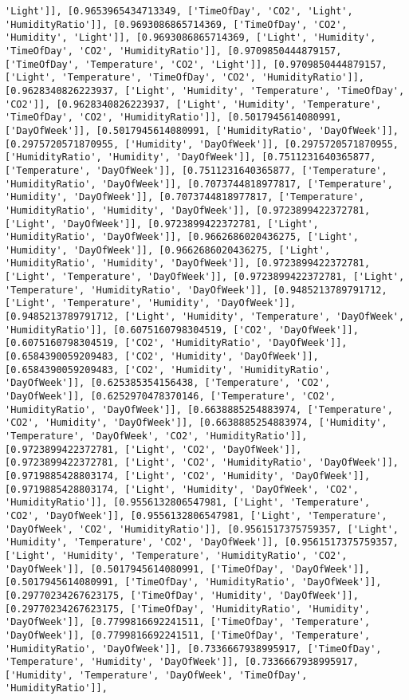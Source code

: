 \documentclass[11pt]{article}
\begin{document}
\begin{Verbatim}[commandchars=\\\{\}]
'Light']], [0.9653965434713349, ['TimeOfDay', 'CO2', 'Light', 'HumidityRatio']], [0.9693086865714369, ['TimeOfDay', 'CO2', 'Humidity', 'Light']], [0.9693086865714369, ['Light', 'Humidity', 'TimeOfDay', 'CO2', 'HumidityRatio']], [0.9709850444879157, ['TimeOfDay', 'Temperature', 'CO2', 'Light']], [0.9709850444879157, ['Light', 'Temperature', 'TimeOfDay', 'CO2', 'HumidityRatio']], [0.9628340826223937, ['Light', 'Humidity', 'Temperature', 'TimeOfDay', 'CO2']], [0.9628340826223937, ['Light', 'Humidity', 'Temperature', 'TimeOfDay', 'CO2', 'HumidityRatio']], [0.5017945614080991, ['DayOfWeek']], [0.5017945614080991, ['HumidityRatio', 'DayOfWeek']], [0.2975720571870955, ['Humidity', 'DayOfWeek']], [0.2975720571870955, ['HumidityRatio', 'Humidity', 'DayOfWeek']], [0.7511231640365877, ['Temperature', 'DayOfWeek']], [0.7511231640365877, ['Temperature', 'HumidityRatio', 'DayOfWeek']], [0.7073744818977817, ['Temperature', 'Humidity', 'DayOfWeek']], [0.7073744818977817, ['Temperature', 'HumidityRatio', 'Humidity', 'DayOfWeek']], [0.9723899422372781, ['Light', 'DayOfWeek']], [0.9723899422372781, ['Light', 'HumidityRatio', 'DayOfWeek']], [0.9662686020436275, ['Light', 'Humidity', 'DayOfWeek']], [0.9662686020436275, ['Light', 'HumidityRatio', 'Humidity', 'DayOfWeek']], [0.9723899422372781, ['Light', 'Temperature', 'DayOfWeek']], [0.9723899422372781, ['Light', 'Temperature', 'HumidityRatio', 'DayOfWeek']], [0.9485213789791712, ['Light', 'Temperature', 'Humidity', 'DayOfWeek']], [0.9485213789791712, ['Light', 'Humidity', 'Temperature', 'DayOfWeek', 'HumidityRatio']], [0.6075160798304519, ['CO2', 'DayOfWeek']], [0.6075160798304519, ['CO2', 'HumidityRatio', 'DayOfWeek']], [0.6584390059209483, ['CO2', 'Humidity', 'DayOfWeek']], [0.6584390059209483, ['CO2', 'Humidity', 'HumidityRatio', 'DayOfWeek']], [0.625385354156438, ['Temperature', 'CO2', 'DayOfWeek']], [0.6252970478370146, ['Temperature', 'CO2', 'HumidityRatio', 'DayOfWeek']], [0.6638885254883974, ['Temperature', 'CO2', 'Humidity', 'DayOfWeek']], [0.6638885254883974, ['Humidity', 'Temperature', 'DayOfWeek', 'CO2', 'HumidityRatio']], [0.9723899422372781, ['Light', 'CO2', 'DayOfWeek']], [0.9723899422372781, ['Light', 'CO2', 'HumidityRatio', 'DayOfWeek']], [0.9719885428803174, ['Light', 'CO2', 'Humidity', 'DayOfWeek']], [0.9719885428803174, ['Light', 'Humidity', 'DayOfWeek', 'CO2', 'HumidityRatio']], [0.9556132806547981, ['Light', 'Temperature', 'CO2', 'DayOfWeek']], [0.9556132806547981, ['Light', 'Temperature', 'DayOfWeek', 'CO2', 'HumidityRatio']], [0.9561517375759357, ['Light', 'Humidity', 'Temperature', 'CO2', 'DayOfWeek']], [0.9561517375759357, ['Light', 'Humidity', 'Temperature', 'HumidityRatio', 'CO2', 'DayOfWeek']], [0.5017945614080991, ['TimeOfDay', 'DayOfWeek']], [0.5017945614080991, ['TimeOfDay', 'HumidityRatio', 'DayOfWeek']], [0.29770234267623175, ['TimeOfDay', 'Humidity', 'DayOfWeek']], [0.29770234267623175, ['TimeOfDay', 'HumidityRatio', 'Humidity', 'DayOfWeek']], [0.7799816692241511, ['TimeOfDay', 'Temperature', 'DayOfWeek']], [0.7799816692241511, ['TimeOfDay', 'Temperature', 'HumidityRatio', 'DayOfWeek']], [0.7336667938995917, ['TimeOfDay', 'Temperature', 'Humidity', 'DayOfWeek']], [0.7336667938995917, ['Humidity', 'Temperature', 'DayOfWeek', 'TimeOfDay', 'HumidityRatio']], 
\end{Verbatim}
\end{document}
